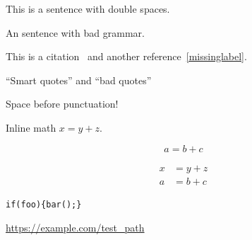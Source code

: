 \documentclass{article}
\begin{document}
This is a sentence with double spaces.

An sentence with bad grammar.

This is a citation~\cite{missing}
and another reference~\ref{missinglabel}.

``Smart quotes'' and ``bad quotes''

Space before punctuation!

Inline math \(x = y + z\).

\begin{equation}
a = b + c
\end{equation}

\begin{align}
x &= y + z \\
a &= b + c
\end{align}

\begin{lstlisting}
if(foo){bar();}
\end{lstlisting}

\url{https://example.com/test_path}
\end{document}

